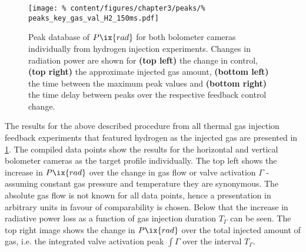 %
    \begin{figure}[t]%
        \centering%
        \texttt{[image: \%
            content/figures/chapter3/peaks/\%
            peaks\_key\_gas\_val\_H2\_150ms.pdf]}%
        \caption{Peak database of $P\ix{rad}$ for both bolometer cameras individually from hydrogen injection experiments. Changes in radiation power are shown for \textbf{(top left)} the change in control, \textbf{(top right)} the approximate injected gas amount, \textbf{(bottom left)} the time between the maximum peak values and \textbf{(bottom right)} the time delay between peaks over the respective feedback control change.}\label{fig:peak_database_H2}%
    \end{figure}%
%
    The results for the above described procedure from all thermal gas injection feedback experiments that featured hydrogen as the injected gas are presented in \cref{fig:peak_database_H2}. The compiled data points show the results for the horizontal and vertical bolometer cameras as the target profile individually. The top left shows the increase in $P\ix{rad}$ over the change in gas flow or valve activation $\Gamma$ - assuming constant gas pressure and temperature they are synonymous. The absolute gas flow is not known for all data points, hence a presentation in arbitrary units in favour of comparability is chosen. Below that the increase in radiative power loss as a function of gas injection duration $T_{\Gamma}$ can be seen. The top right image shows the change in $P\ix{rad}$ over the total injected amount of gas, i.e. the integrated valve activation peak $\int\Gamma$ over the interval $T_{\Gamma}$.\\%
